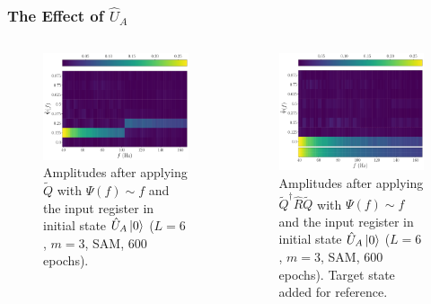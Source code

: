 \documentclass{beamer}
\begin{document}
\begin{frame}
\frametitle{The Effect of $\hat{U}_A$} 
\begin{columns}
\begin{column}{0.5\textwidth}
\begin{figure}
\centering 
\includegraphics[width=\textwidth]{im/Q_amp_linear_UA}
\caption{Amplitudes after applying $\tilde{Q}$ with $\Psi(f) \sim f$ and the input register in initial state $\hat{U}_A \ket{0}$ ($L=6$, $m=3$, SAM, 600 epochs). }
\end{figure}
\end{column}
\begin{column}{0.5\textwidth}
\begin{figure}
\centering 
\includegraphics[width=\textwidth]{im/QRQ_amp_linear_UA}
\caption{Amplitudes after applying $\tilde{Q}^\dagger \hat{R} \tilde{Q}$ with $\Psi(f) \sim f$ and the input register in initial state $\hat{U}_A \ket{0}$ ($L=6$, $m=3$, SAM, 600 epochs). Target state added for reference.}
\end{figure}
\end{column}
\end{columns}
\end{frame}
\end{document}

